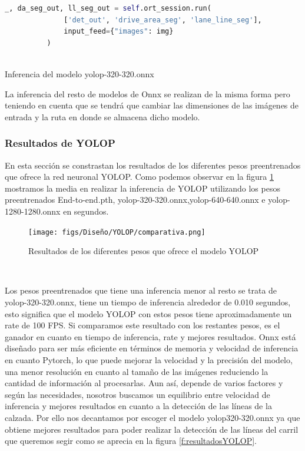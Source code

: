         \begin{code}[h]
          \begin{lstlisting}[language=Python]
            _, da_seg_out, ll_seg_out = self.ort_session.run(
              ['det_out', 'drive_area_seg', 'lane_line_seg'],
              input_feed={"images": img}
          )
        
          \end{lstlisting}
          \caption[Inferencia del modelo yolop-320-320.onnx]{Inferencia del modelo yolop-320-320.onnx}
          \label{cod:Inferencia_onnx}
          \end{code}  

        La inferencia del resto de modelos de Onnx se realizan de la misma forma pero teniendo en cuenta que se tendrá que cambiar las dimensiones de las imágenes de entrada y la ruta
        en donde se almacena dicho modelo. 


\subsubsection{Resultados de YOLOP }
\label{sec:resultados}
En esta sección se constrastan los resultados de los diferentes pesos preentrenados que ofrece la red neuronal YOLOP. Como podemos observar en la figura \ref{fig:resultados_pesos_preentrenados} 
mostramos la media en realizar la inferencia de YOLOP utilizando los pesos preentrenados End-to-end.pth, yolop-320-320.onnx,yolop-640-640.onnx e yolop-1280-1280.onnx en segundos.

\begin{figure} [H]
  \begin{center}
    \texttt{[image: figs/Diseño/YOLOP/comparativa.png]}
  \end{center}
  \caption{Resultados de los diferentes pesos que ofrece el modelo YOLOP}
  \label{fig:resultados_pesos_preentrenados}
\end{figure}\

Los pesos preentrenados que tiene una inferencia menor al resto se trata de yolop-320-320.onnx, tiene un tiempo de inferencia alrededor de 0.010 segundos, esto
significa que el modelo YOLOP con estos pesos tiene aproximadamente un rate de 100 FPS. Si comparamos este resultado con los restantes pesos, es el ganador en cuanto 
en tiempo de inferencia, rate y mejores resultados. 
Onnx está diseñado para ser más eficiente en términos de memoria y velocidad de inferencia en cuanto Pytorch, lo que puede mejorar la velocidad y la precisión
del modelo, una menor resolución en cuanto al tamaño de las imágenes reduciendo la cantidad de información al procesarlas. Aun así, depende de varios factores y según las necesidades, nosotros
buscamos un equilibrio entre velocidad de inferencia y mejores resultados en cuanto a la detección de las líneas de la calzada. 
Por ello nos decantamos por escoger el modelo yolop320-320.onnx ya que obtiene mejores resultados para poder realizar la detección de las líneas del carril que 
queremos segir como se aprecia en la figura \ref{f:resultadosYOLOP}.\newline

